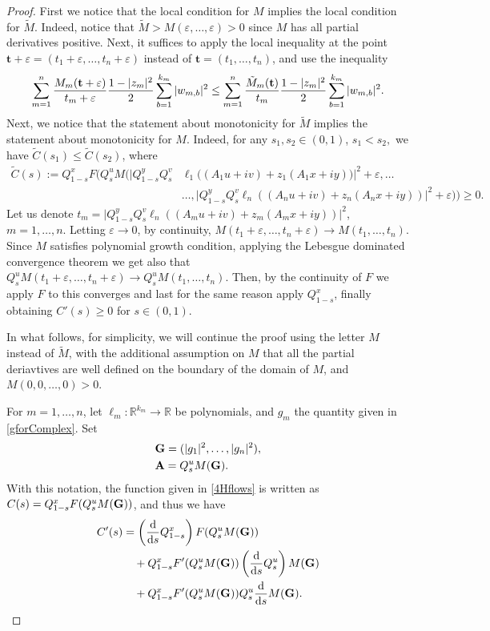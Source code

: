 \documentclass[9pt, a4paper]{amsart}
\newcommand{\R}{\mathbb{R}}
\newcommand{\1}{{\chi_{}}}%
\numberwithin{equation}{section}
\begin{document}
\begin{proof}
		First we notice that the local condition for $M$ implies the local condition for $\tilde{M}$. Indeed, notice that $\tilde{M} > M(\varepsilon, \ldots, \varepsilon) > 0$ since $M$ has all partial derivatives positive. Next, it suffices to apply the local inequality at the point $\mathbf{t} + \varepsilon = (t_1 + \varepsilon, \ldots, t_n + \varepsilon)$ instead of $\mathbf{t} = (t_1, \ldots, t_n)$, and use the inequality
		\begin{align*}
			\sum_{m=1}^n\frac{M_{m}({\bf{t}}+\varepsilon)}{t_m+\varepsilon}\frac{1-|z_m|^2}{2}\sum_{b=1}^{k_m}|w_{m,b}|^2\leq 	\sum_{m=1}^n\frac{\tilde{M}_{m}({\bf{t}})}{t_m}\frac{1-|z_m|^2}{2}\sum_{b=1}^{k_m}|w_{m,b}|^2.
		\end{align*}
		Next, we notice that the statement about  monotonicity for $\tilde{M}$ implies the statement about monotonicity for $M$. Indeed, for any $s_{1}, s_{2} \in (0,1)$, $s_{1}<s_{2},$ we have $\tilde{C}(s_{1})\leq \tilde{C}(s_{2})$, where 
		\begin{align*}
			\tilde{C}(s):=Q_{1-s}^x F\big(Q_s^uM\big(\big|Q_{1-s}^yQ_s^v&\ell_1((A_1u+iv)+z_1(A_1x+iy)\big)\big|^2+\varepsilon,\ldots\\
			&\ldots,\big|Q_{1-s}^yQ_s^v\ell_n((A_n u+iv)+z_n(A_n x+iy))\big|^2+\varepsilon\big)\big)\geq0.
		\end{align*}
		Let us denote $t_m=\big|Q_{1-s}^yQ_s^v\ell_n((A_m u+iv)+z_m(A_m x+iy))\big|^2$, $m=1,\ldots,n$. Letting $\varepsilon \to 0$, by continuity, $M(t_1 + \varepsilon, \ldots, t_n + \varepsilon) \to M(t_1, \ldots, t_n)$. Since $M$  satisfies polynomial growth condition, applying the Lebesgue dominated convergence theorem we get also that $Q_s^{u}M(t_1+\varepsilon,\ldots,t_n+\varepsilon)\to Q_s^{u}M(t_1,\ldots,t_n)$. Then, by the continuity of $F$ we apply $F$ to this converges and last for the same reason apply $Q_{1-s}^x$, finally obtaining $C'(s) \geq 0$ for $s \in (0,1)$. 
        
        In what follows, for simplicity, we will continue the proof using the letter $M$ instead of $\tilde{M}$, with the additional assumption on $M$ that all the partial deriavtives are well defined on the boundary of the domain of $M$, and $M(0,0, \ldots, 0)>0$.
		
		For $m=1,\ldots,n$, let $\ell_m:\R^{k_m}\to\R$ be polynomials,  and $g_m$ the quantity given in \eqref{gforComplex}. Set
				\begin{align*}
			&{\bf{G}}=(|g_1|^2,\ldots,|g_n|^2),\\
			&{\bf{A}}=Q_{s}^{u}M({\bf{G}}).
		\end{align*}
		With this notation, the function given in \eqref{4Hflows} is written as $C(s)=Q_{1-s}^xF(Q_{s}^{u}M({\bf{G}}))$, and thus we have 
        \begin{align*}
	C'(s)&=\left(\frac{\mathrm{d}}{\mathrm{d}s}Q_{1-s}^x\right)F(Q_{s}^{u}M({\bf{G}}))\\
	&\quad+Q_{1-s}^xF'(Q_{s}^{u}M({\bf{G}}))\left(\frac{\mathrm{d}}{\mathrm{d} s}Q_s^u\right)M({\bf{G}}) \\
	&\quad+Q_{1-s}^xF'(Q_{s}^{u}M({\bf{G}})) Q_s^u\frac{\mathrm{d}}{\mathrm{d} s} M({\bf{G}}).
\end{align*}


\end{proof}
\end{document}
